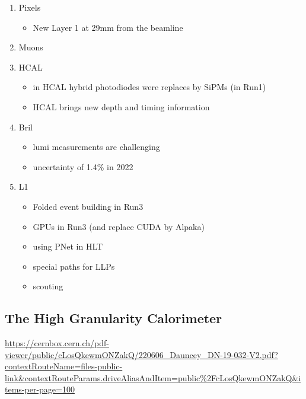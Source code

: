\documentclass[11pt]{article}
\begin{document}
\begin{enumerate}
\item Pixels
\label{sec:org1128ad3}
\begin{itemize}
\item New Layer 1 at 29mm from the beamline
\end{itemize}
\item Muons
\label{sec:org6073f23}
\item HCAL
\label{sec:orgbc2c7a4}
\begin{itemize}
\item in HCAL hybrid photodiodes were replaces by SiPMs (in Run1)
\item HCAL brings new depth and timing information
\end{itemize}
\item Bril
\label{sec:org324484a}
\begin{itemize}
\item lumi measurements are challenging
\item uncertainty of 1.4\% in 2022
\end{itemize}
\item L1
\label{sec:org963ef05}
\begin{itemize}
\item Folded event building in Run3
\item GPUs in Run3 (and replace CUDA by Alpaka)
\item using PNet in HLT
\item special paths for LLPs
\item scouting
\end{itemize}
\end{enumerate}
\subsection{The High Granularity Calorimeter}
\label{sec:orga7e5831}
\label{sec:hgcal_intro}

\url{https://cernbox.cern.ch/pdf-viewer/public/cLosQkewmONZakQ/220606\_Dauncey\_DN-19-032-V2.pdf?contextRouteName=files-public-link\&contextRouteParams.driveAliasAndItem=public\%2FcLosQkewmONZakQ\&items-per-page=100}
\end{document}
